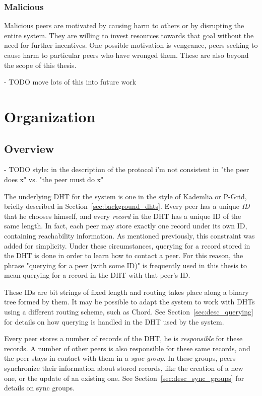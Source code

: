\subsubsection{Malicious}
Malicious peers are motivated by causing harm to others or by disrupting the
entire system. They are willing to invest resources towards that goal without
the need for further incentives. One possible motivation is vengeance, peers
seeking to cause harm to particular peers who have wronged them. These are also
beyond the scope of this thesis.

- TODO move lots of this into future work

\section{Organization}
\subsection{Overview}
- TODO style: in the description of the protocol i'm not consistent in "the peer
  does x" vs. "the peer must do x"

The underlying \ac{DHT} for the system is one in the style of Kademlia or
P-Grid, briefly described in Section~\ref{sec:background_dhts}. Every peer has a
unique \emph{ID} that he chooses himself, and every \emph{record} in the
\ac{DHT} has a unique ID of the same length. In fact, each peer may store
exactly one record under its own ID, containing reachability information. As
mentioned previously, this constraint was added for simplicity. Under these
circumstances, querying for a record stored in the \ac{DHT} is done in order to
learn how to contact a peer. For this reason, the phrase "querying for a peer
(with some ID)" is frequently used in this thesis to mean querying for a record
in the \ac{DHT} with that peer's ID.

These IDs are bit strings of fixed length and routing takes place along a binary
tree formed by them. It may be possible to adapt the system to work with
\acp{DHT} using a different routing scheme, such as Chord. See
Section~\ref{sec:desc_querying} for details on how querying is handled in the
\ac{DHT} used by the system.

Every peer stores a number of records of the \ac{DHT}, he is \emph{responsible}
for these records. A number of other peers is also responsible for these same
records, and the peer stays in contact with them in a \emph{sync group}. In
these groups, peers synchronize their information about stored records, like the
creation of a new one, or the update of an existing one. See
Section~\ref{sec:desc_sync_groups} for details on sync groups.

